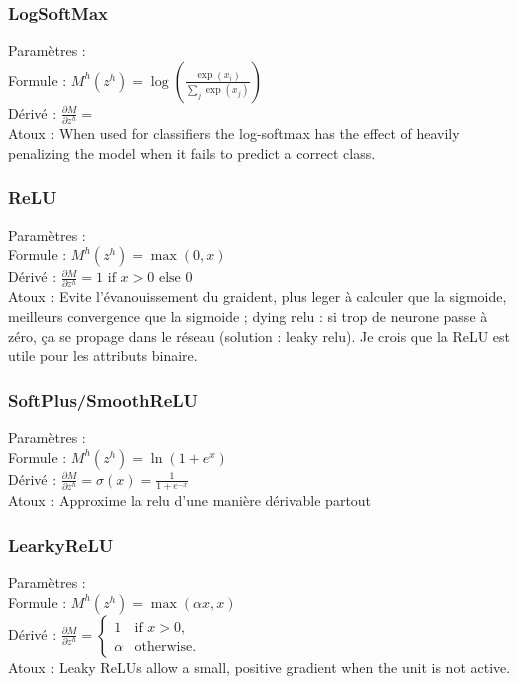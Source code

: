\documentclass{article}
\begin{document}
\begin{multicols}{2}
\begin{multicols}{2}
\subsubsection{LogSoftMax}
Paramètres : \\
Formule : $ M^h(z^h) = \log ( \frac{ \exp(x_i) }{ \sum_j \exp(x_j) } ) $ \\
Dérivé : $ \frac{\partial M}{\partial z^h} =  $ \\
Atoux : When used for classifiers the log-softmax has the effect of heavily penalizing the model when it fails to predict a correct class.

\subsubsection{ReLU}
Paramètres : \\
Formule : $ M^h(z^h) = \max (0, x) $ \\
Dérivé : $ \frac{\partial M}{\partial z^h} = 1 \text{ if } x > 0 \text{ else } 0 $ \\
Atoux : Evite l'évanouissement du graident, plus leger à calculer que la sigmoide, meilleurs convergence que la sigmoide ; dying relu : si trop de neurone passe à zéro, ça se propage dans le réseau (solution : leaky relu). Je crois que la ReLU est utile pour les attributs binaire.

\subsubsection{SoftPlus/SmoothReLU}
Paramètres : \\
Formule : $ M^h(z^h) = \ln (1 + e^x) $ \\
Dérivé : $ \frac{\partial M}{\partial z^h} = \sigma (x) = \frac{1}{1 + e^{-x}} $ \\
Atoux : Approxime la relu d'une manière dérivable partout

\subsubsection{LearkyReLU}
Paramètres : \\
Formule : $ M^h(z^h) = \max(\alpha x, x) $ \\
Dérivé : $ \frac{\partial M}{\partial z^h} = 
    \begin{cases} 
        1 & \text{if } x>0, \\
        \alpha & \text{otherwise}.
    \end{cases}$ \\
Atoux : Leaky ReLUs allow a small, positive gradient when the unit is not active.


\end{multicols}
\end{multicols}
\end{document}
